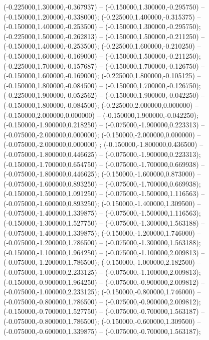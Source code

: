  (-0.225000,1.300000,-0.367937) -- (-0.150000,1.300000,-0.295750) -- (-0.150000,1.200000,-0.338000);
 (-0.225000,1.400000,-0.315375) -- (-0.150000,1.400000,-0.253500) -- (-0.150000,1.300000,-0.295750);
 (-0.225000,1.500000,-0.262813) -- (-0.150000,1.500000,-0.211250) -- (-0.150000,1.400000,-0.253500);
 (-0.225000,1.600000,-0.210250) -- (-0.150000,1.600000,-0.169000) -- (-0.150000,1.500000,-0.211250);
 (-0.225000,1.700000,-0.157687) -- (-0.150000,1.700000,-0.126750) -- (-0.150000,1.600000,-0.169000);
 (-0.225000,1.800000,-0.105125) -- (-0.150000,1.800000,-0.084500) -- (-0.150000,1.700000,-0.126750);
 (-0.225000,1.900000,-0.052562) -- (-0.150000,1.900000,-0.042250) -- (-0.150000,1.800000,-0.084500);
 (-0.225000,2.000000,0.000000) -- (-0.150000,2.000000,0.000000) -- (-0.150000,1.900000,-0.042250);
 (-0.150000,-1.900000,0.218250) -- (-0.075000,-1.900000,0.223313) -- (-0.075000,-2.000000,0.000000);
 (-0.150000,-2.000000,0.000000) -- (-0.075000,-2.000000,0.000000) ;
 (-0.150000,-1.800000,0.436500) -- (-0.075000,-1.800000,0.446625) -- (-0.075000,-1.900000,0.223313);
 (-0.150000,-1.700000,0.654750) -- (-0.075000,-1.700000,0.669938) -- (-0.075000,-1.800000,0.446625);
 (-0.150000,-1.600000,0.873000) -- (-0.075000,-1.600000,0.893250) -- (-0.075000,-1.700000,0.669938);
 (-0.150000,-1.500000,1.091250) -- (-0.075000,-1.500000,1.116563) -- (-0.075000,-1.600000,0.893250);
 (-0.150000,-1.400000,1.309500) -- (-0.075000,-1.400000,1.339875) -- (-0.075000,-1.500000,1.116563);
 (-0.150000,-1.300000,1.527750) -- (-0.075000,-1.300000,1.563188) -- (-0.075000,-1.400000,1.339875);
 (-0.150000,-1.200000,1.746000) -- (-0.075000,-1.200000,1.786500) -- (-0.075000,-1.300000,1.563188);
 (-0.150000,-1.100000,1.964250) -- (-0.075000,-1.100000,2.009813) -- (-0.075000,-1.200000,1.786500);
 (-0.150000,-1.000000,2.182500) -- (-0.075000,-1.000000,2.233125) -- (-0.075000,-1.100000,2.009813);
 (-0.150000,-0.900000,1.964250) -- (-0.075000,-0.900000,2.009812) -- (-0.075000,-1.000000,2.233125);
 (-0.150000,-0.800000,1.746000) -- (-0.075000,-0.800000,1.786500) -- (-0.075000,-0.900000,2.009812);
 (-0.150000,-0.700000,1.527750) -- (-0.075000,-0.700000,1.563187) -- (-0.075000,-0.800000,1.786500);
 (-0.150000,-0.600000,1.309500) -- (-0.075000,-0.600000,1.339875) -- (-0.075000,-0.700000,1.563187);
